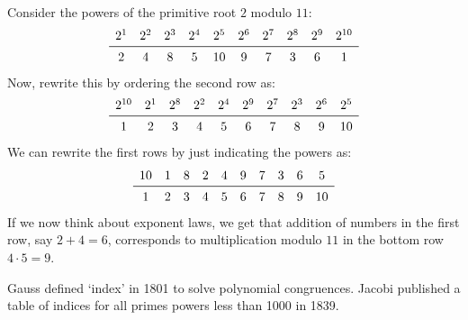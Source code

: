 Consider the powers of the primitive root $ 2 $ modulo $ 11 $:
\[ \begin{array}{cccccccccc}
        2^1 & 2^2 & 2^3 & 2^4 & 2^5 & 2^6 & 2^7 & 2^8 & 2^9 & 2^{10} \\
        \midrule
        2   & 4   & 8   & 5   & 10  & 9   & 7   & 3   & 6   & 1
    \end{array} \]
Now, rewrite this by ordering the second row as:
\[ \begin{array}{cccccccccc}
        2^{10} & 2^1 & 2^8 & 2^2 & 2^4 & 2^9 & 2^7 & 2^3 & 2^6 & 2^5 \\
        \midrule
        1      & 2   & 3   & 4   & 5   & 6   & 7   & 8   & 9   & 10
    \end{array} \]
We can rewrite the first rows by just indicating the powers as:
\[ \begin{array}{cccccccccc}
        10 & 1 & 8 & 2 & 4 & 9 & 7 & 3 & 6 & 5  \\
        \midrule
        1  & 2 & 3 & 4 & 5 & 6 & 7 & 8 & 9 & 10
    \end{array} \]
If we now think about exponent laws, we get that addition of numbers in the first row,
say $ 2+4=6 $, corresponds to multiplication modulo $ 11 $ in the bottom row $ 4\cdot 5=9 $.

Gauss defined `index' in 1801 to solve polynomial congruences. Jacobi published a table of indices for all primes powers less than 1000 in 1839.


